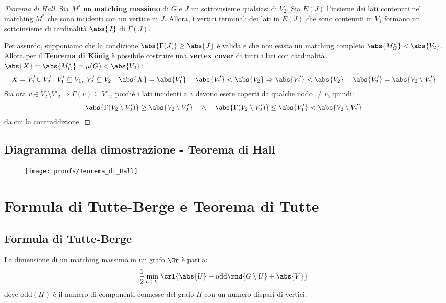 \documentclass[\main/main.tex]{subfiles}
\begin{document}
\begin{proof}[Teorema di Hall]
	Sia \(M^*\) un \textbf{matching massimo} di \(G\) e \(J\) un sottoinsieme qualsiasi di \(V_2\). Sia \(E(J)\) l'insieme dei lati contenuti nel matching \(M^*\) che sono incidenti con un vertice in \(J\). Allora, i vertici terminali dei lati in \(E(J)\) che sono contenuti in \(V_1\) formano un sottoinsieme di cardinalità \(\abs{J}\) di \(\Gamma(J)\).

	Per assurdo, supponiamo che la condizione \(\abs{\Gamma(J)} \geq \abs{J}\) è valida e che non esista un matching completo \(\abs{M_G^*} < \abs{V_2}\). Allora per il \textbf{Teorema di König} è possibile costruire una \textbf{vertex cover} di tutti i lati con cardinalità \(\abs{X} = \abs{M_G^*} = \mu(G) < \abs{V_2}\):
	\[
		X=V'_1 \cup V'_2: V'_1 \subseteq V_1,\;V'_2 \subseteq V_2 \quad \abs{X} = \abs{V_1'} + \abs{V_2'} < \abs{V_2} \Rightarrow \abs{V'_1} < \abs{V_2} - \abs{V'_2} = \abs{V_2 \setminus V'_2}
	\]
	Sia ora \(v \in V_2 \setminus V'_2 \Rightarrow \Gamma(v) \subseteq V'_1\), poiché i lati incidenti a \(v\) devono esere coperti da qualche nodo \(\neq v\), quindi:
	\[
		\abs{\Gamma(V_2\setminus V'_2)} \geq \abs{V_2\setminus V'_2} \quad \land \quad \abs{\Gamma(V_2\setminus V'_2)} \leq \abs{V'_1} <  \abs{V_2\setminus V'_2}
	\]
	da cui la contraddizione.
\end{proof}
\clearpage
\subsection{Diagramma della dimostrazione - Teorema di Hall}
\begin{figure}
	\texttt{[image: proofs/Teorema\_di\_Hall]}
\end{figure}
\section{Formula di Tutte-Berge e Teorema di Tutte}
\subsection{Formula di Tutte-Berge}
\begin{theorem}
	La dimensione di un matching massimo in un grafo \(\Gr \) è pari a:
	\[
		\frac{1}{2} \min_{U \subseteq V} \crl{\abs{U} - \text{odd}\rnd{G\setminus U} + \abs{V}}
	\]
	dove \(\text{odd}(H)\) è il numero di componenti connesse del grafo \(H\) con un numero dispari di vertici.
\end{theorem}
\end{document}
